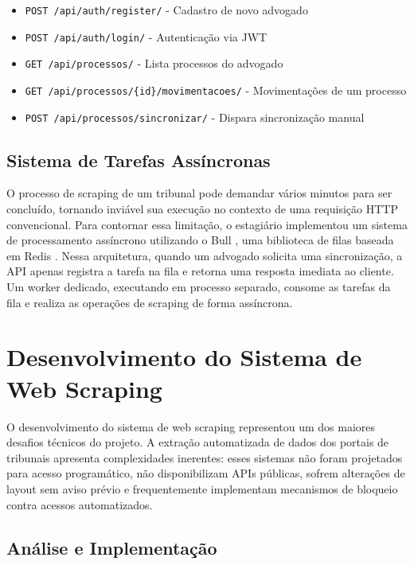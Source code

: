 \documentclass[
	12pt,
	oneside,
	a4paper,
	brazil,
	sumario=tradicional
]{abntex2}
\begin{document}
\begin{itemize}
    \item \texttt{POST /api/auth/register/} - Cadastro de novo advogado
    \item \texttt{POST /api/auth/login/} - Autenticação via JWT \cite{jwt_docs}
    \item \texttt{GET /api/processos/} - Lista processos do advogado
    \item \texttt{GET /api/processos/\{id\}/movimentacoes/} - Movimentações de um processo
    \item \texttt{POST /api/processos/sincronizar/} - Dispara sincronização manual
\end{itemize}

\subsection{Sistema de Tarefas Assíncronas}

O processo de scraping de um tribunal pode demandar vários minutos para ser concluído, tornando inviável sua execução no contexto de uma requisição HTTP convencional. Para contornar essa limitação, o estagiário implementou um sistema de processamento assíncrono utilizando o Bull \cite{bull_docs}, uma biblioteca de filas baseada em Redis \cite{redis_docs}. Nessa arquitetura, quando um advogado solicita uma sincronização, a API apenas registra a tarefa na fila e retorna uma resposta imediata ao cliente. Um worker dedicado, executando em processo separado, consome as tarefas da fila e realiza as operações de scraping de forma assíncrona.

\section{Desenvolvimento do Sistema de Web Scraping}

O desenvolvimento do sistema de web scraping representou um dos maiores desafios técnicos do projeto. A extração automatizada de dados dos portais de tribunais apresenta complexidades inerentes: esses sistemas não foram projetados para acesso programático, não disponibilizam APIs públicas, sofrem alterações de layout sem aviso prévio e frequentemente implementam mecanismos de bloqueio contra acessos automatizados.

\subsection{Análise e Implementação}
\end{document}
